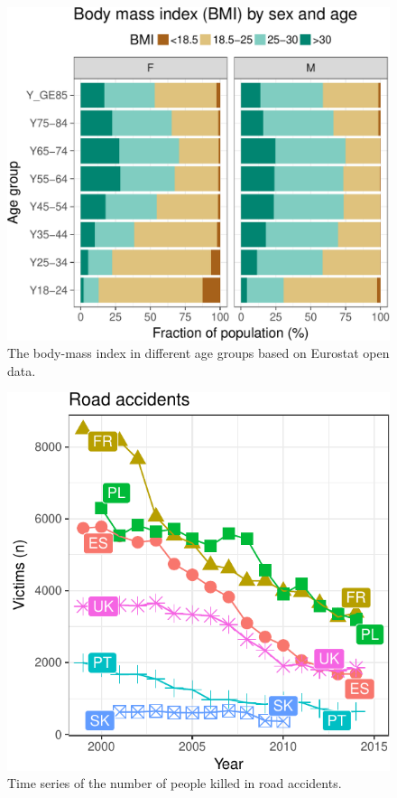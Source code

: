 \begin{figure}
\begin{center}
\includegraphics{2015-manu-bmi-1}
\end{center}
\caption{The body-mass index in different age groups based on Eurostat open data.}
\label{fig:bmi}
\end{figure}


\begin{figure}
\begin{center}
\includegraphics{2015-manu-roadacc-1}
\end{center}
\caption{Time series of the number of people killed in road accidents.}
\label{fig:roadaccidents}
\end{figure}





